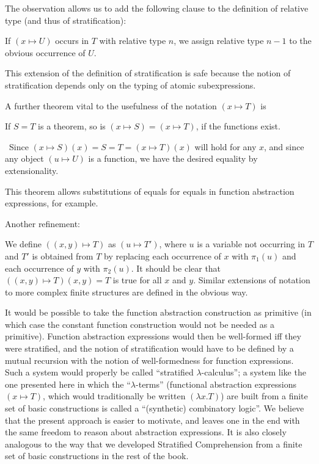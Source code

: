 The observation allows us to add the following clause to the
definition of relative type (and thus of
stratification):

\begin{definition}
 If $(x \mapsto U)$ occurs in $T$ with relative type
 $n$, we assign relative type $n-1$ to the obvious occurrence of $U$.
\end{definition}

This extension of the definition of stratification is
safe because the notion of stratification depends only on the typing of atomic
subexpressions.

A further theorem vital to the usefulness of the notation $(x \mapsto T)$ is

\begin{thm}
 If $S = T$ is a theorem, so is $(x \mapsto S) = (x
 \mapsto T)$, if the functions exist.
\end{thm}

\preuve\ Since $(x \mapsto S)(x) = S = T = (x\mapsto T)(x)$ will
hold for any $x$, and since any object $(u \mapsto U)$ is a function,
we have the desired equality by extensionality.
\finpreuve

This theorem allows substitutions of equals for equals in function
abstraction expressions, for example.

Another refinement:

\begin{definition}
 We define $((x,y) \mapsto T)$ as $(u \mapsto T')$,
 where $u$ is a variable not occurring in $T$ and $T'$ is obtained from
 $T$ by replacing each occurrence of $x$ with $\pi_1(u)$ and each
 occurrence of $y$ with $\pi_2(u)$.  It should be clear that
 $((x,y)\mapsto T)(x,y) = T$ is true for all $x$ and $y$.  Similar
 extensions of notation to more complex finite
 structures are defined in the obvious way.
\end{definition}

It would be possible to take the function abstraction
construction as primitive (in which case the constant function
construction would not be needed as a primitive).  Function
abstraction expressions would then be
well-formed iff they were stratified, and the
notion of stratification would have to be defined by a mutual
recursion with the notion of well-formedness for function expressions.
Such a system would properly be called ``stratified
$\lambda$-calculus''; a system
like the one presented here in which the ``$\lambda$-terms''
(functional abstraction expressions $(x \mapsto T)$, which would
traditionally be written $(\lambda x.T)$) are built from a finite set
of basic constructions is called a ``(synthetic) combinatory
logic''.  We believe that the present
approach is easier to motivate, and leaves one in the end with the
same freedom to reason about abstraction expressions.  It is also
closely analogous to the way that we developed Stratified
Comprehension from a finite
set of basic constructions in the rest of the book.


